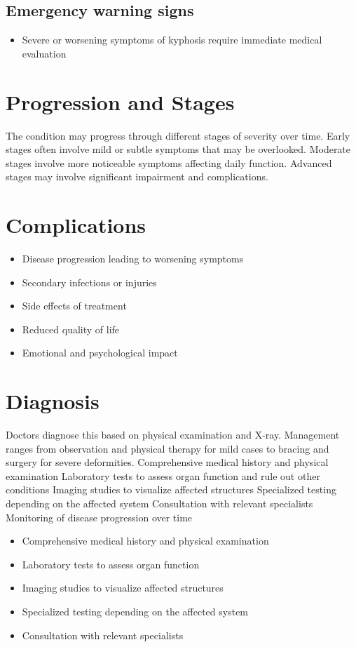 \subsection{Emergency warning signs}
\begin{itemize}[noitemsep]
  \item Severe or worsening symptoms of kyphosis require immediate medical evaluation
\end{itemize}
\section{Progression and Stages}
The condition may progress through different stages of severity over time. Early stages often involve mild or subtle symptoms that may be overlooked. Moderate stages involve more noticeable symptoms affecting daily function. Advanced stages may involve significant impairment and complications.
\section{Complications}
\begin{itemize}[noitemsep]
  \item Disease progression leading to worsening symptoms
  \item Secondary infections or injuries
  \item Side effects of treatment
  \item Reduced quality of life
  \item Emotional and psychological impact
\end{itemize}
\section{Diagnosis}
Doctors diagnose this based on physical examination and X-ray. Management ranges from observation and physical therapy for mild cases to bracing and surgery for severe deformities. Comprehensive medical history and physical examination Laboratory tests to assess organ function and rule out other conditions Imaging studies to visualize affected structures Specialized testing depending on the affected system Consultation with relevant specialists Monitoring of disease progression over time

\begin{itemize}[noitemsep]
  \item Comprehensive medical history and physical examination
  \item Laboratory tests to assess organ function
  \item Imaging studies to visualize affected structures
  \item Specialized testing depending on the affected system
  \item Consultation with relevant specialists
\end{itemize}
